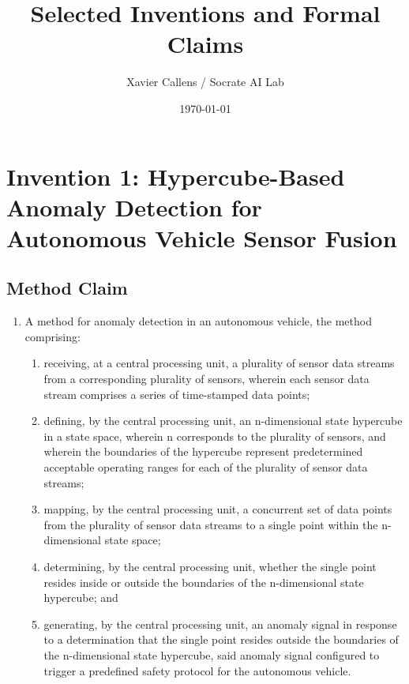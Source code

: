 \documentclass{article}
\title{Selected Inventions and Formal Claims}
\author{Xavier Callens / Socrate AI Lab}
\date{\today}
\begin{document}
\maketitle

\section{Invention 1: Hypercube-Based Anomaly Detection for Autonomous Vehicle Sensor Fusion}

\subsection{Method Claim}
\begin{enumerate}[label=1.]
    \item A method for anomaly detection in an autonomous vehicle, the method comprising:
    \begin{enumerate}[label=(\alph*)]
        \item receiving, at a central processing unit, a plurality of sensor data streams from a corresponding plurality of sensors, wherein each sensor data stream comprises a series of time-stamped data points;
        \item defining, by the central processing unit, an n-dimensional state hypercube in a state space, wherein n corresponds to the plurality of sensors, and wherein the boundaries of the hypercube represent predetermined acceptable operating ranges for each of the plurality of sensor data streams;
        \item mapping, by the central processing unit, a concurrent set of data points from the plurality of sensor data streams to a single point within the n-dimensional state space;
        \item determining, by the central processing unit, whether the single point resides inside or outside the boundaries of the n-dimensional state hypercube; and
        \item generating, by the central processing unit, an anomaly signal in response to a determination that the single point resides outside the boundaries of the n-dimensional state hypercube, said anomaly signal configured to trigger a predefined safety protocol for the autonomous vehicle.
    \end{enumerate}
\end{enumerate}
\end{document}
